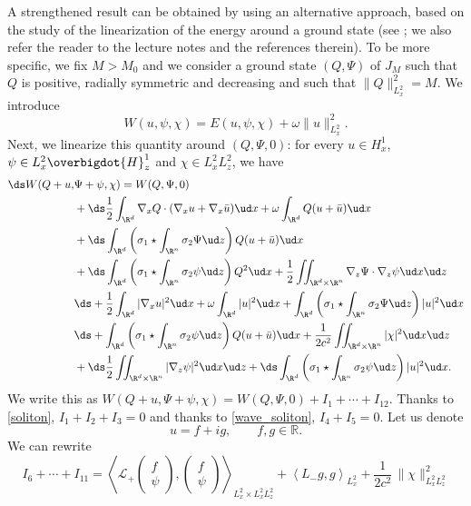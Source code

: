 A strengthened result can be obtained by using an alternative approach, based on the study of the linearization of the energy around a ground state (see
\cite{MaMe,Weinstein1,Weinstein2}; we also refer the reader to the lecture notes \cite[\S 2.6]{Martel} and the references therein). To be more specific, we fix $M>M_{0}$ and we consider a ground state $(Q,\Psi)$ of $J_{M}$ such that $Q$ is positive, radially symmetric and decreasing and such that $\|Q\|_{L_{x}^{2}}^{2}=M$. We introduce
\[
W(u,\psi,\chi)=E(u,\psi,\chi)+\omega\|u\|_{L_{x}^{2}}^{2}.
\]
Next, we linearize this quantity around $(Q,\Psi,0)$: for every $u\in H_{x}^{1}$, $\psi\in L_{x}^{2}\overbigdot{H}_{z}^{1}$ and $\chi\in L_{x}^{2}L_{z}^{2}$, we have\vspace*{-3pt}
\begin{align*}
\ds W(Q+u,&\Psi+\psi,\chi)=W(Q,\Psi,0)\\
&+ \ds \frac{1}{2}\int_{\R^{d}}\nabla_{x}Q\cdot(\nabla_{x}u+\nabla_{x}\bar{u})\ud x+\omega\int_{\R^{d}}Q(u+\bar{u})\ud x
\\
&+\ds\int_{\R^{d}}\left(\sigma_{1}\star\int_{\R^{n}}\sigma_{2}\Psi\ud z\right)Q(u+\bar{u})\ud x
\\
&+\ds\int_{\R^{d}}\left(\sigma_{1}\star\int_{\R^{n}}\sigma_{2}\psi\ud z\right)Q^{2}\ud x+\frac{1}{2}\iint_{\R^{d}\times\R^{n}}\nabla_{z}\Psi\cdot\nabla_{z}\psi\ud x\ud z
\\
&\ds +\frac{1}{2}\int_{\R^{d}}|\nabla_{x}u|^{2}\ud x+\omega\int_{\R^{d}}|u|^{2}\ud x+\int_{\R^{d}}\left(\sigma_{1}\star\int_{\R^{n}}\sigma_{2}\Psi\ud z\right)|u|^{2}\ud x\\
&\ds +\int_{\R^{d}}\left(\sigma_{1}\star\int_{\R^{n}}\sigma_{2}\psi\ud z\right)Q(u+\bar{u})\ud x+\frac{1}{2c^{2}}\iint_{\R^{d}\times\R^{n}}|\chi|^{2}\ud x\ud z
\\
&+\ds\frac{1}{2}\iint_{\R^{d}\times\R^{n}}|\nabla_{z}\psi|^{2}\ud x\ud z
+ \ds \int_{\R^{d}}\left(\sigma_{1}\star\int_{\R^{n}}\sigma_{2}\psi\ud z\right)|u|^{2}\ud x.
\end{align*}
We write this as $W(Q+u,\Psi+\psi,\chi)=W(Q,\Psi,0)+I_1+\cdots+I_{12}$.
Thanks to \eqref{soliton}, $I_1+I_2+I_3=0$ and thanks to \eqref{wave_soliton}, $I_4+I_5=0$. Let us denote\vspace*{-3pt}
\[
u=f+i g,\qquad f,g\in \mathbb R.
\]
We can rewrite\vspace*{-3pt}
\[
I_ 6+\cdots+I_{11}= \left\langle\mathcal{L}_{+}\begin{pmatrix} f\\\psi \end{pmatrix},\begin{pmatrix} f\\\psi \end{pmatrix}\right\rangle_{L_{x}^{2}\times L_{x}^{2}L_{z}^{2}}+\left\langle L_{-}g,g\right\rangle_{L_{x}^{2}}+\frac{1}{2c^{2}}\,\|\chi\|_{L_{x}^{2}L_{z}^{2}}^{2}
\]
